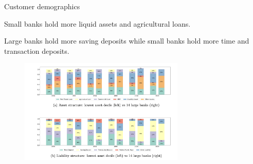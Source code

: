 \documentclass[notes,10pt, aspectratio=169]{beamer}
\newenvironment{wideitemize}{\itemize\addtolength{\itemsep}{10pt}}{\enditemize}
\begin{document}
\begin{frame}{Customer demographics}

        
            \begin{wideitemize}
        
                \item Small banks hold more liquid assets and agricultural loans.
                \item Large banks hold more saving deposits while small banks hold more time and transaction deposits.
        \end{wideitemize}
        
        \begin{figure}
        \centering
        \includegraphics[width=0.7\textwidth]{imgs/fig7.png}
        \end{figure}
        
\end{frame}
    
    



\end{document}

